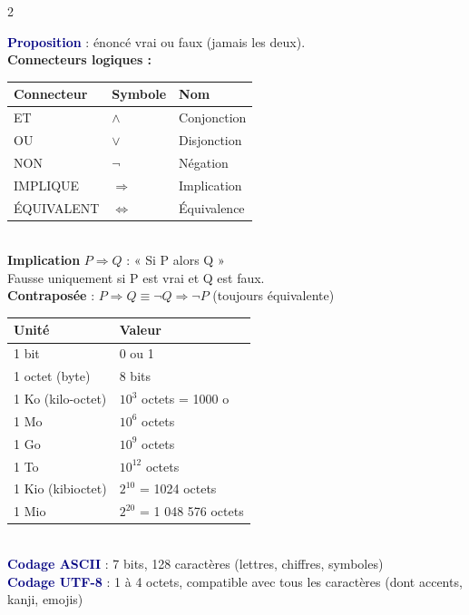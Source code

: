 \documentclass[a4paper,10pt]{article}
\newcommand{\key}[1]{\textbf{\textcolor{navy}{#1}}}
\begin{document}
\begin{multicols}{2}
\begin{tcolorbox}[basebox, colframe=teal, title=8. Logique — Propositions]
\key{Proposition} : énoncé vrai ou faux (jamais les deux).\\[4pt]
\textbf{Connecteurs logiques :}
\begin{tabular}{lll}
\toprule
\textbf{Connecteur} & \textbf{Symbole} & \textbf{Nom} \\
\midrule
ET & $\wedge$ & Conjonction \\
OU & $\vee$ & Disjonction \\
NON & $\neg$ & Négation \\
IMPLIQUE & $\Rightarrow$ & Implication \\
ÉQUIVALENT & $\Leftrightarrow$ & Équivalence \\
\bottomrule
\end{tabular}
\vspace{4pt}\\
\textbf{Implication} $P \Rightarrow Q$ : « Si P alors Q »\\
Fausse uniquement si P est vrai et Q est faux.\\[4pt]
\textbf{Contraposée} : $P \Rightarrow Q \equiv \neg Q \Rightarrow \neg P$ (toujours équivalente)
\end{tcolorbox}

\begin{tcolorbox}[basebox, colframe=green, title=9. Représentation des données informatiques]
\begin{tabular}{ll}
\toprule
\textbf{Unité} & \textbf{Valeur} \\
\midrule
1 bit & 0 ou 1 \\
1 octet (byte) & 8 bits \\
1 Ko (kilo-octet) & $10^3$ octets = 1000 o \\
1 Mo & $10^6$ octets \\
1 Go & $10^9$ octets \\
1 To & $10^{12}$ octets \\
1 Kio (kibioctet) & $2^{10}$ = 1024 octets \\
1 Mio & $2^{20}$ = 1 048 576 octets \\
\bottomrule
\end{tabular}
\vspace{4pt}\\
\key{Codage ASCII} : 7 bits, 128 caractères (lettres, chiffres, symboles) \\
\key{Codage UTF-8} : 1 à 4 octets, compatible avec tous les caractères (dont accents, kanji, emojis)
\end{tcolorbox}


\end{multicols}
\end{document}

